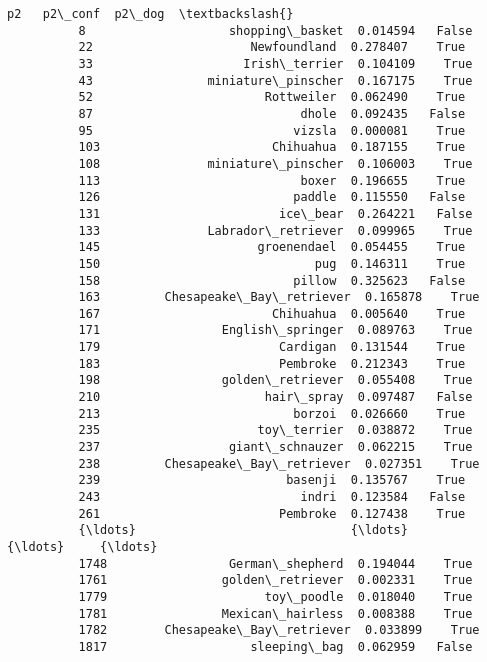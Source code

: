 \documentclass[11pt]{article}
\begin{document}
\begin{Verbatim}[commandchars=\\\{\}]
                                            p2   p2\_conf  p2\_dog  \textbackslash{}
          8                    shopping\_basket  0.014594   False   
          22                      Newfoundland  0.278407    True   
          33                     Irish\_terrier  0.104109    True   
          43                miniature\_pinscher  0.167175    True   
          52                        Rottweiler  0.062490    True   
          87                             dhole  0.092435   False   
          95                            vizsla  0.000081    True   
          103                        Chihuahua  0.187155    True   
          108               miniature\_pinscher  0.106003    True   
          113                            boxer  0.196655    True   
          126                           paddle  0.115550   False   
          131                         ice\_bear  0.264221   False   
          133               Labrador\_retriever  0.099965    True   
          145                      groenendael  0.054455    True   
          150                              pug  0.146311    True   
          158                           pillow  0.325623   False   
          163         Chesapeake\_Bay\_retriever  0.165878    True   
          167                        Chihuahua  0.005640    True   
          171                 English\_springer  0.089763    True   
          179                         Cardigan  0.131544    True   
          183                         Pembroke  0.212343    True   
          198                 golden\_retriever  0.055408    True   
          210                       hair\_spray  0.097487   False   
          213                           borzoi  0.026660    True   
          235                      toy\_terrier  0.038872    True   
          237                  giant\_schnauzer  0.062215    True   
          238         Chesapeake\_Bay\_retriever  0.027351    True   
          239                          basenji  0.135767    True   
          243                            indri  0.123584   False   
          261                         Pembroke  0.127438    True   
          {\ldots}                              {\ldots}       {\ldots}     {\ldots}   
          1748                 German\_shepherd  0.194044    True   
          1761                golden\_retriever  0.002331    True   
          1779                      toy\_poodle  0.018040    True   
          1781                Mexican\_hairless  0.008388    True   
          1782        Chesapeake\_Bay\_retriever  0.033899    True   
          1817                    sleeping\_bag  0.062959   False   

\end{Verbatim}
\end{document}
